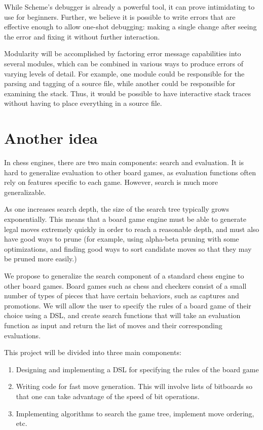 \documentclass{scrartcl}
\begin{document}
While Scheme's debugger is already a powerful tool, it can prove intimidating
to use for beginners. Further, we believe it is possible to write errors that
are effective enough to allow one-shot debugging: making a single change after
seeing the error and fixing it without further interaction.

Modularity will be accomplished by factoring error message capabilities into
several modules, which can be combined in various ways to produce errors of
varying levels of detail. For example, one module could be responsible for the
parsing and tagging of a source file, while another could be responsible for
examining the stack. Thus, it would be possible to have interactive stack
traces without having to place everything in a source file.


\section{Another idea}

In chess engines, there are two main components: search and evaluation. It is hard to generalize evaluation to other board games, as evaluation functions often rely on features specific to each game. However, search is much more generalizable.

As one increases search depth, the size of the search tree typically grows exponentially. This means that a board game engine must be able to generate legal moves extremely quickly in order to reach a reasonable depth, and must also have good ways to prune (for example, using alpha-beta pruning with some optimizations, and finding good ways to sort candidate moves so that they may be pruned more easily.) 

We propose to generalize the search component of a standard chess engine to other board games. Board games such as chess and checkers consist of a small number of types of pieces that have certain behaviors, such as captures and promotions. We will allow the user to specify the rules of a board game of their choice using a DSL, and create search functions that will take an evaluation function as input and return the list of moves and their corresponding evaluations.

This project will be divided into three main components:

\begin{enumerate}
\item Designing and implementing a DSL for specifying the rules of the board game
\item Writing code for fast move generation. This will involve lists of bitboards so that one can take advantage of the speed of bit operations.
\item Implementing algorithms to search the game tree, implement move ordering, etc.
\end{enumerate}
\end{document}
